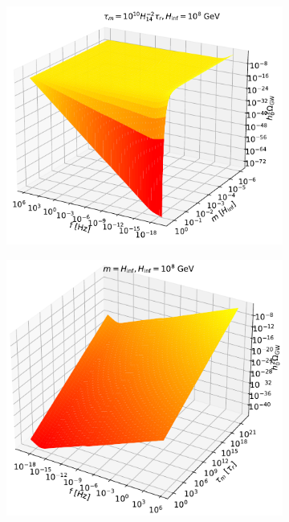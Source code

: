 \documentclass[prd,twocolumn,aps,psfig,nofootinbib,nobibnotes,superscriptaddress,preprintnumbers,times]{revtex4-2}
\begin{document}
\begin{figure}
\begin{subfigure}{.5\textwidth}
  \centering
  \includegraphics[width=.88\linewidth]{fig2a.pdf}  
  \label{fig:contour-a}
\end{subfigure}
\begin{subfigure}{.5\textwidth}
  \centering
  \includegraphics[width=.88\linewidth]{fig2b.pdf}  
  \label{fig:contour-b}
\end{subfigure}
\begin{subfigure}{.5\textwidth}
  \centering

\end{subfigure}
\end{figure}
\end{document}
